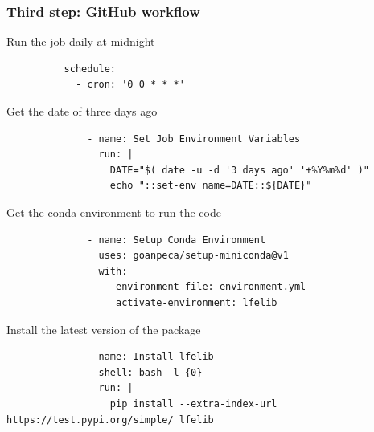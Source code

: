 \documentclass{beamer}
\begin{document}
	\begin{frame}[fragile]
		\frametitle{Third step: GitHub workflow}
		\begin{block}{Run the job daily at midnight}
		\tiny{
		\begin{verbatim}
		  schedule:
		    - cron: '0 0 * * *' 
		\end{verbatim}
		}
		\end{block}
		\begin{block}{Get the date of three days ago}
		\tiny{
		\begin{verbatim}
		      - name: Set Job Environment Variables
		        run: |
		          DATE="$( date -u -d '3 days ago' '+%Y%m%d' )"
		          echo "::set-env name=DATE::${DATE}"
		\end{verbatim}
		}
		\end{block}
		\begin{block}{Get the conda environment to run the code}
		\tiny{
		\begin{verbatim}
		      - name: Setup Conda Environment
		        uses: goanpeca/setup-miniconda@v1
		        with:
		           environment-file: environment.yml
		           activate-environment: lfelib
		\end{verbatim}
		}
		\end{block}
		\begin{block}{Install the latest version of the package}
		\tiny{
		\begin{verbatim}
		      - name: Install lfelib
		        shell: bash -l {0}
		        run: |
		          pip install --extra-index-url https://test.pypi.org/simple/ lfelib
		\end{verbatim}
		}
		\end{block}
	\end{frame}
\end{document}

